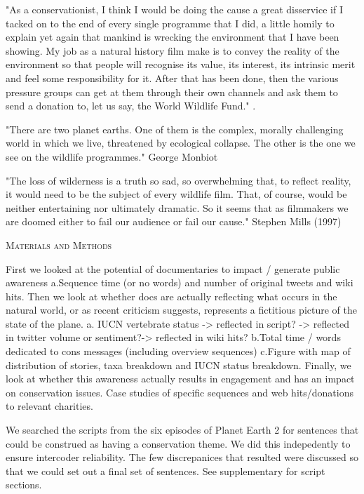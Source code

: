 \documentclass[12pt,letterpaper]{article}
\renewcommand{\section}[1]{%
\bigskip
\begin{center}
\begin{Large}
\normalfont\scshape #1
\medskip
\end{Large}
\end{center}}
\begin{document}
"As a conservationist, I think I would be doing the cause a great disservice if I tacked on to the end of every single programme that I did, a little homily to explain yet again that mankind is wrecking the environment that I have been showing. My job as a natural history film make is to convey the reality of the environment so that people will recognise its value, its interest, its intrinsic merit and feel some responsibility for it. After that has been done, then the various pressure groups can get at them through their own channels and ask them to send a donation to, let us say, the World Wildlife Fund." \cite{burgess1984exploring}.

"There are two planet earths. One of them is the complex, morally challenging world in which we live, threatened by ecological collapse. The other is the one we see on the wildlife programmes." George Monbiot

"The loss of wilderness is a truth so sad, so overwhelming that, to reflect reality, it would need to be the subject of every wildlife film. That, of course, would be neither entertaining nor ultimately dramatic. So it seems that as filmmakers we are doomed either to fail our audience or fail our cause."
Stephen Mills (1997)

%
%
\section{Materials and Methods}

First we looked at the potential of documentaries to impact / generate public awareness a.Sequence time (or no words) and number of original tweets and wiki hits. Then we look at whether docs are actually reflecting what occurs in the natural world, or as recent criticism suggests, represents a fictitious picture of the state of the plane. a. IUCN vertebrate status -> reflected in script? -> reflected in twitter volume or sentiment?-> reflected in wiki hits? b.Total time / words dedicated to cons messages (including overview sequences) c.Figure with map of distribution of stories, taxa breakdown and IUCN status breakdown. Finally, we look at whether this awareness actually results in engagement and has an impact on conservation issues. Case studies of specific sequences and web hits/donations to relevant charities.

We searched the scripts from the six episodes of Planet Earth 2 for sentences that could be construed as having a conservation theme. We did this indepedently to ensure intercoder reliability. The few discrepanices that resulted were discussed so that we could set out a final set of sentences. See supplementary for script sections. 
\end{document}
